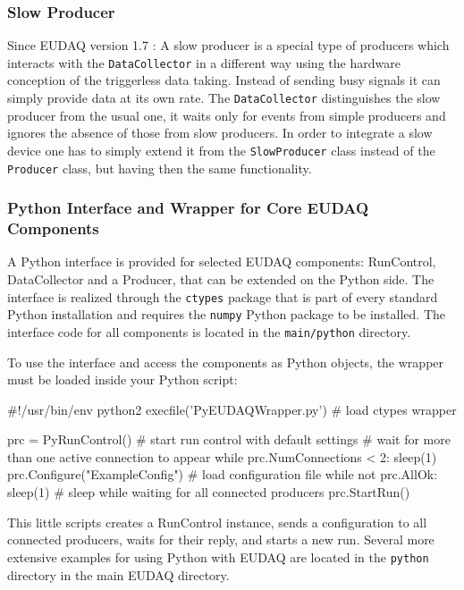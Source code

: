 \subsubsection{Slow Producer}
Since EUDAQ version 1.7 \cite{Shirokova:2016}: A slow producer is a special type of producers which interacts with the \texttt{DataCollector} in a different way using the hardware conception of the triggerless data taking. Instead of sending busy signals it can simply provide data at its own rate. The \texttt{DataCollector} distinguishes the slow producer from the usual one, it waits only for events from simple producers and ignores the absence of those from slow producers.
In order to integrate a slow device one has to simply extend it from the \texttt{SlowProducer} class instead of the \texttt{Producer} class, but having then the same functionality. 


\subsubsection{Python Interface and Wrapper for Core EUDAQ Components}
\label{sssec:pywrapper}
A Python interface is provided for selected EUDAQ components:
RunControl, DataCollector and a Producer, that can be extended on the
Python side. The interface is realized through the \texttt{ctypes}
package that is part of every standard Python installation and
requires the \texttt{numpy} Python package to be installed. The
interface code for all components is located in the
\texttt{main/python} directory.

To use the interface and access the components as Python objects, the
wrapper must be loaded inside your Python script:

\begin{listing}[python]
  #!/usr/bin/env python2 
  execfile('PyEUDAQWrapper.py') # load ctypes wrapper

  prc = PyRunControl() # start run control with default settings
  # wait for more than one active connection to appear
  while prc.NumConnections < 2:
      sleep(1)
  prc.Configure("ExampleConfig") # load configuration file
  while not prc.AllOk:
      sleep(1) # sleep while waiting for all connected producers
  prc.StartRun()
\end{listing}

This little scripts creates a RunControl instance, sends a
configuration to all connected producers, waits for their reply, and
starts a new run. Several more extensive examples for using Python
with EUDAQ are located in the \texttt{python} directory in the main
EUDAQ directory.

